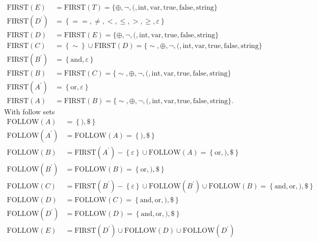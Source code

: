 \documentclass{report}
\begin{document}
\begin{itemize}
\begin{align*}
                \text{FIRST}(E) &=\text{FIRST}(T) = \{\oplus,\neg,(, \text{int}, \text{var}, \text{true}, \text{false}, \text{string}\} \\
                \text{FIRST}(D^{\prime}) &= \left\{==,\ne,<, \leq,>, \geq,\varepsilon\right\} \\
                \text{FIRST}(D) &= \text{FIRST}(E) = \{\oplus,\neg,(, \text{int}, \text{var}, \text{true}, \text{false}, \text{string}\} \\
                \text{FIRST}(C) &= \left\{\sim\right\} \cup \text{FIRST}(D) = \{\sim, \oplus,\neg,(, \text{int}, \text{var}, \text{true}, \text{false}, \text{string}\} \\
                \text{FIRST}(B^{\prime}) &= \left\{\text{and}, \varepsilon\right\} \\
                \text{FIRST}(B) &= \text{FIRST}(C) = \{\sim, \oplus,\neg,(, \text{int}, \text{var}, \text{true}, \text{false}, \text{string}\} \\
                \text{FIRST}(A^{\prime}) &= \left\{\text{or}, \varepsilon\right\} \\
                \text{FIRST}(A) &= \text{FIRST}(B) =\{\sim, \oplus,\neg,(, \text{int}, \text{var}, \text{true}, \text{false}, \text{string}\} 
            .\end{align*}
            With follow sets
            \begin{align*}
                \text{FOLLOW}(A) &= \left\{), \$\right\} \\
                \text{FOLLOW}(A^{\prime}) &= \text{FOLLOW}(A) = \left\{), \$\right\} \\
                \text{FOLLOW}(B) &= \text{FIRST}(A^{\prime}) - \left\{\varepsilon\right\} \cup \text{FOLLOW}(A) = \left\{\text{or}, ), \$\right\} \\
                \text{FOLLOW}(B^{\prime}) &= \text{FOLLOW}(B) = \left\{\text{or}, ), \$\right\} \\
                \text{FOLLOW}(C) &= \text{FIRST}(B^{\prime}) - \left\{\varepsilon\right\}\cup \text{FOLLOW}(B^{\prime}) \cup \text{FOLLOW}(B) = \left\{\text{and}, \text{or}, ), \$\right\} \\
                \text{FOLLOW}(D) &= \text{FOLLOW}(C) = \left\{\text{and}, \text{or}, ), \$\right\} \\
                \text{FOLLOW}(D^{\prime}) &= \text{FOLLOW}(D) = \left\{\text{and}, \text{or}, ), \$\right\} \\
                \text{FOLLOW}(E) &= \text{FIRST}(D^{\prime}) \cup \text{FOLLOW}(D) \cup \text{FOLLOW}(D^{\prime}) \\

\end{align*}
\end{itemize}
\end{document}
